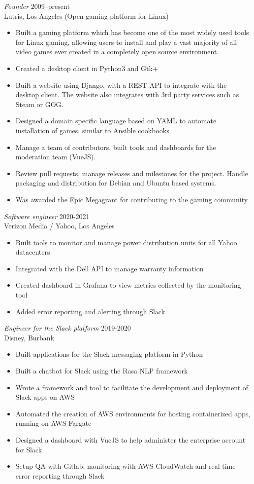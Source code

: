 \documentclass[line,resmargin]{res}
\begin{document}
\begin{resume}
{\sl Founder\/} \hfill 2009--present\\
Lutris, Los Angeles (Open gaming platform for Linux)
\begin{itemize} \itemsep -2pt
\item Built a gaming platform which has become one of the most widely used tools for Linux gaming, allowing users to install and play a vast majority of all video games ever created in a completely open source environment.
\item Created a desktop client in Python3 and Gtk+
\item Built a website using Django, with a REST API to integrate with the desktop client. The website also integrates with 3rd party services such as Steam or GOG.
\item Designed a domain specific language based on YAML to automate installation of games, similar to Ansible cookbooks
\item Manage a team of contributors, built tools and dashboards for the moderation team (VueJS).
\item Review pull requests, manage releases and milestones for the project. Handle packaging and distribution for Debian and Ubuntu based systems.
\item Was awarded the Epic Megagrant for contributing to the gaming community
\end{itemize}

{\sl Software engineer\/} \hfill 2020-2021\\
Verizon Media / Yahoo, Los Angeles
\begin{itemize} \itemsep -2pt
\item Built tools to monitor and manage power distribution units for all Yahoo datacenters
\item Integrated with the Dell API to manage warranty information
\item Created dashboard in Grafana to view metrics collected by the monitoring tool
\item Added error reporting and alerting through Slack
\end{itemize}

{\sl Engineer for the Slack platform\/} \hfill 2019-2020\\
Disney, Burbank
\begin{itemize} \itemsep -2pt
\item Built applications for the Slack messaging platform in Python
\item Built a chatbot for Slack using the Rasa NLP framework
\item Wrote a framework and tool to facilitate the development and deployment of Slack apps on AWS
\item Automated the creation of AWS environments for hosting containerized apps, running on AWS Fargate
\item Designed a dashboard with VueJS to help administer the enterprise account for Slack
\item Setup QA with Gitlab, monitoring with AWS CloudWatch and real-time error reporting through Slack
\end{itemize}


\end{resume}
\end{document}
